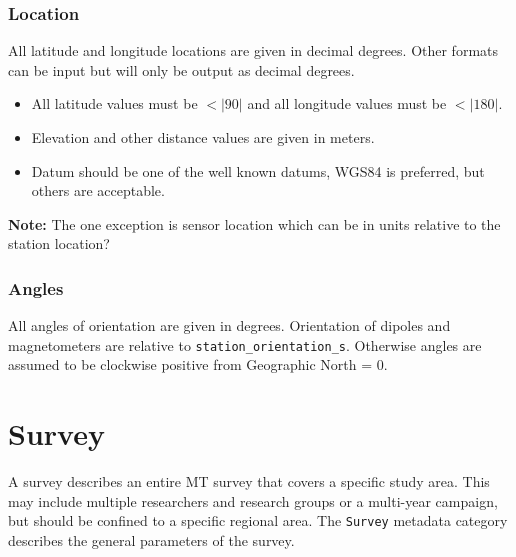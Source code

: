 \documentclass{article}
\begin{document}
\subsubsection{Location}

All latitude and longitude locations are given in decimal degrees. Other formats can be input but will only be output as decimal degrees.

\begin{itemize}
	\setlength\itemsep{0em}
	\item All latitude values must be $<|90|$ and all longitude values must be $<|180|$.
	\item Elevation and other distance values are given in meters.
	\item Datum should be one of the well known datums, WGS84 is preferred, but others are acceptable.
\end{itemize} 

\textbf{Note:} The one exception is sensor location which can be in units relative to the station location?  

\subsubsection{Angles}

All angles of orientation are given in degrees.  Orientation of dipoles and magnetometers are relative to \verb|station_orientation_s|.  Otherwise angles are assumed to be clockwise positive from Geographic North = 0.  

\newpage
\section{Survey}

A survey describes an entire MT survey that covers a specific study area.  This may include multiple researchers and research groups or a multi-year campaign, but should be confined to a specific regional area.  The \verb|Survey| metadata category describes the general parameters of the survey. 
\end{document}
